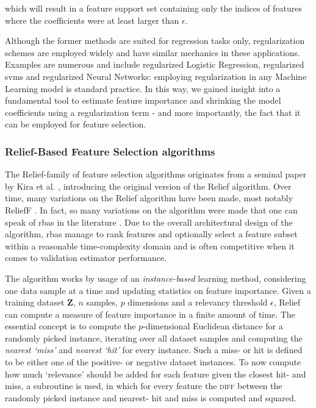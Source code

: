 \documentclass{article}
\begin{document}
which will result in a feature support set containing only the indices of features where the coefficients were at least larger than $\epsilon$.

Although the former methods are suited for regression tasks only, regularization schemes are employed widely and have similar mechanics in these applications. Examples are numerous and include regularized Logistic Regression, regularized \glspl{svm} and regularized Neural Networks: employing regularization in any Machine Learning model is standard practice. In this way, we gained insight into a fundamental tool to estimate feature importance and shrinking the model coefficients using a regularization term - and more importantly, the fact that it can be employed for feature selection.

\subsubsection{Relief-Based Feature Selection algorithms}
The Relief-family of feature selection algorithms originates from a seminal paper by Kira et al. \citep{kira_feature_1992}, introducing the original version of the Relief algorithm. Over time, many variations on the Relief algorithm have been made, most notably ReliefF \citep{kononenko_estimating_1994}. In fact, so many variations on the algorithm were made that one can speak of \glspl{rba} in the literature \citep{urbanowicz_relief-based_2018}. Due to the overall architectural design of the algorithm, \glspl{rba} manage to rank features and optionally select a feature subset within a reasonable time-complexity domain and is often competitive when it comes to validation estimator performance.

The algorithm works by usage of an \textit{instance-based} learning method, considering one data sample at a time and updating statistics on feature importance. Given a training dataset $\mathbf{Z}$, $n$ samples, $p$ dimensions and a relevancy threshold $\epsilon$, Relief can compute a measure of feature importance in a finite amount of time. The essential concept is to compute the $p$-dimensional Euclidean distance for a randomly picked instance, iterating over all dataset samples and computing the \textit{nearest `miss'} and \textit{nearest `hit'} for every instance. Such a miss- or hit is defined to be either one of the positive- or negative dataset instances. To now compute how much `relevance' should be added for each feature given the closest hit- and miss, a subroutine is used, in which for every feature the \textsc{diff} between the randomly picked instance and nearest- hit and miss is computed and squared.
\end{document}

